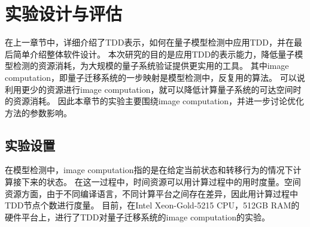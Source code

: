 \chapter{实验设计与评估}
在上一章节中，详细介绍了TDD表示，如何在量子模型检测中应用TDD，并在最后简单介绍整体软件设计。
本次研究的目的是应用TDD的表示能力，降低量子模型检测的资源消耗，为大规模的量子系统验证提供更实用的工具。
其中image computation，即量子迁移系统的一步映射是模型检测中，反复用的算法。
可以说利用更少的资源进行image computation，就可以降低计算量子系统的可达空间时的资源消耗。
因此本章节的实验主要围绕image computation，并进一步讨论优化方法的参数影响。
\section{实验设置}
在模型检测中，image computation指的是在给定当前状态和转移行为的情况下计算接下来的状态。
在这一过程中，时间资源可以用计算过程中的用时度量。空间资源方面，由于不同编译语言，不同计算平台之间存在差异，因此用计算过程中TDD节点个数进行度量。
目前，在Intel Xeon-Gold-5215 CPU，512GB RAM的硬件平台上，进行了TDD对量子迁移系统的image computation的实验。

